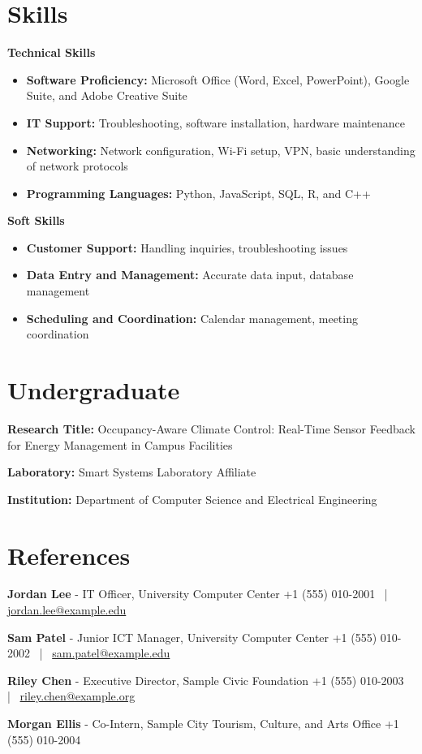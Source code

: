 \documentclass[10pt,a4paper]{article}
\begin{document}
\section*{Skills}

\textbf{Technical Skills}
\begin{itemize}
    \item \textbf{Software Proficiency:} Microsoft Office (Word, Excel, PowerPoint), Google Suite, and Adobe Creative Suite
    \item \textbf{IT Support:} Troubleshooting, software installation, hardware maintenance
    \item \textbf{Networking:} Network configuration, Wi-Fi setup, VPN, basic understanding of network protocols
    \item \textbf{Programming Languages:} Python, JavaScript, SQL, R, and C++
\end{itemize}

\textbf{Soft Skills}
\begin{itemize}
    \item \textbf{Customer Support:} Handling inquiries, troubleshooting issues
    \item \textbf{Data Entry and Management:} Accurate data input, database management
    \item \textbf{Scheduling and Coordination:} Calendar management, meeting coordination
\end{itemize}

\section*{Undergraduate}

\textbf{Research Title:} Occupancy-Aware Climate Control: Real-Time Sensor Feedback for Energy Management in Campus Facilities\par
\textbf{Laboratory:} Smart Systems Laboratory Affiliate\par
\textbf{Institution:} Department of Computer Science and Electrical Engineering

\section*{References}

\textbf{Jordan Lee} - IT Officer, University Computer Center \hfill +1 (555) 010-2001 \, | \, \href{mailto:jordan.lee@example.edu}{jordan.lee@example.edu}

\textbf{Sam Patel} - Junior ICT Manager, University Computer Center \hfill +1 (555) 010-2002 \, | \, \href{mailto:sam.patel@example.edu}{sam.patel@example.edu}

\textbf{Riley Chen} - Executive Director, Sample Civic Foundation \hfill +1 (555) 010-2003 \, | \, \href{mailto:riley.chen@example.org}{riley.chen@example.org}

\textbf{Morgan Ellis} - Co-Intern, Sample City Tourism, Culture, and Arts Office \hfill +1 (555) 010-2004
\end{document}
